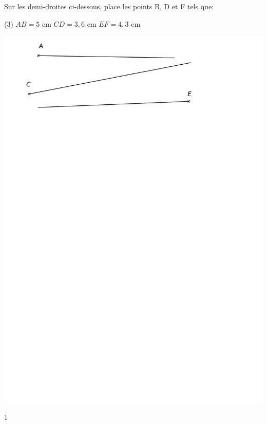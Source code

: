 \documentclass[a4paper,11pt]{report}
\begin{document}
\newpage
\begin{exop}
{Sur les demi-droites ci-dessous, place les points B, D et F tels que:
\begin{tasks}(3)
    \task $AB=5$ cm
    \task $CD=3,6$ cm
    \task $EF=4,3$ cm
\end{tasks}
\begin{center}
\includegraphics[scale=0.8]{media/es-11/13-13}
\end{center}
}    
{1}
\end{exop}
\end{document}
